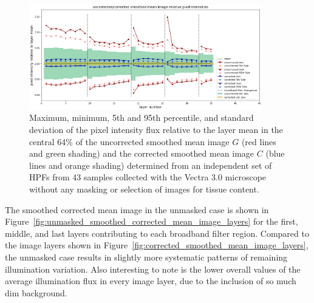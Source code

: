 \documentclass[letterpaper,11pt]{article}
\newcommand{\reffig}[1]{Figure~\ref{#1}}
\begin{document}
\begin{figure}[!ht]
\centering
\includegraphics[width=0.90\textwidth]{images/results/unmasked_flatfield_illumination_variation_reduction}
\caption{\footnotesize Maximum, minimum, 5th and 95th percentile, and standard deviation of the pixel intensity flux relative to the layer mean in the central 64\% of the uncorrected smoothed mean image $G$ (red lines and green shading) and the corrected smoothed mean image $C$ (blue lines and orange shading) determined from an independent set of HPFs from 43 samples collected with the Vectra 3.0 microscope without any masking or selection of images for tissue content.}
\label{fig:unmasked_illumination_variation_reduction}
\end{figure} 

The smoothed corrected mean image in the unmasked case is shown in \reffig{fig:unmasked_smoothed_corrected_mean_image_layers} for the first, middle, and last layers contributing to each broadband filter region. Compared to the image layers shown in \reffig{fig:corrected_smoothed_mean_image_layers}, the unmasked case results in slightly more systematic patterns of remaining illumination variation. Also interesting to note is the lower overall values of the average illumination flux in every image layer, due to the inclusion of so much dim background.
\end{document}
